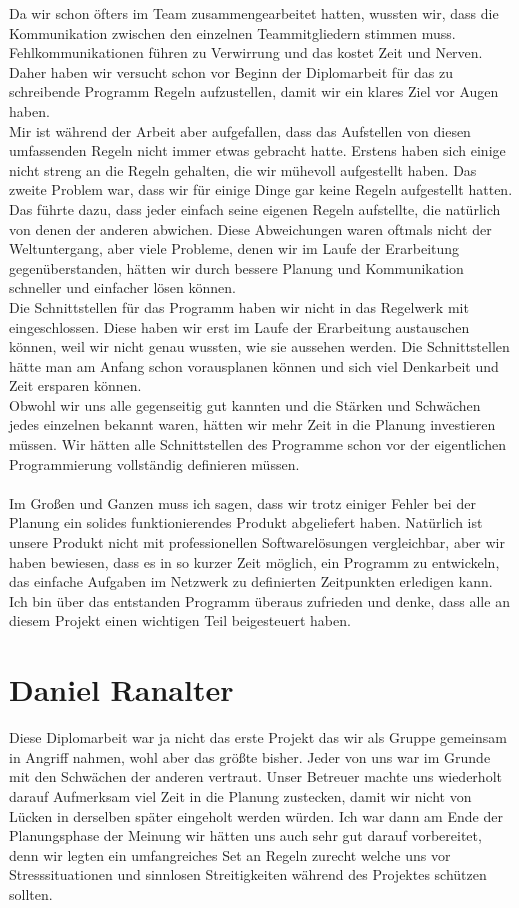 \documentclass[12pt,a4paper]{report}
\begin{document}
Da wir schon öfters im Team zusammengearbeitet hatten, wussten wir, dass die Kommunikation zwischen den einzelnen Teammitgliedern stimmen muss. Fehlkommunikationen führen zu Verwirrung und das kostet Zeit und Nerven. Daher haben wir versucht schon vor Beginn der Diplomarbeit für das zu schreibende Programm Regeln aufzustellen, damit wir ein klares Ziel vor Augen haben.\\ 
Mir ist während der Arbeit aber aufgefallen, dass das Aufstellen von diesen umfassenden Regeln nicht immer etwas gebracht hatte. Erstens haben sich einige nicht streng an die Regeln gehalten, die wir mühevoll aufgestellt haben. Das zweite Problem war, dass wir für einige Dinge gar keine Regeln aufgestellt hatten. Das führte dazu, dass jeder einfach seine eigenen Regeln aufstellte, die natürlich von denen der anderen abwichen. Diese Abweichungen waren oftmals nicht der Weltuntergang, aber viele Probleme, denen wir im Laufe der Erarbeitung gegenüberstanden, hätten wir durch bessere Planung und Kommunikation schneller und einfacher lösen können.\\
Die Schnittstellen für das Programm haben wir nicht in das Regelwerk mit eingeschlossen. Diese haben wir erst im Laufe der Erarbeitung austauschen können, weil wir nicht genau wussten, wie sie aussehen werden. Die Schnittstellen hätte man am Anfang schon vorausplanen können und sich viel Denkarbeit und Zeit ersparen können.\\
Obwohl wir uns alle gegenseitig gut kannten und die Stärken und Schwächen jedes einzelnen bekannt waren, hätten wir mehr Zeit in die Planung investieren müssen. Wir hätten alle Schnittstellen des Programme schon vor der eigentlichen Programmierung vollständig definieren müssen.\\\\
Im Großen und Ganzen muss ich sagen, dass wir trotz einiger Fehler bei der Planung ein solides funktionierendes Produkt abgeliefert haben. Natürlich ist unsere Produkt nicht mit professionellen Softwarelösungen vergleichbar, aber wir haben bewiesen, dass es in so kurzer Zeit möglich, ein Programm zu entwickeln, das einfache Aufgaben im Netzwerk zu definierten Zeitpunkten erledigen kann. Ich bin über das entstanden Programm überaus zufrieden und denke, dass alle an diesem Projekt einen wichtigen Teil beigesteuert haben.

\chapter{Daniel Ranalter}
Diese Diplomarbeit war ja nicht das erste Projekt das wir als Gruppe gemeinsam in Angriff nahmen, wohl aber das größte bisher. Jeder von uns war im Grunde mit den Schwächen der anderen vertraut. Unser Betreuer machte uns wiederholt darauf Aufmerksam viel Zeit in die Planung zustecken, damit wir nicht von Lücken in derselben später eingeholt werden würden. Ich war dann am Ende der Planungsphase der Meinung wir hätten uns auch sehr gut darauf vorbereitet, denn wir legten ein umfangreiches Set an Regeln zurecht welche uns vor Stresssituationen und sinnlosen Streitigkeiten während des Projektes schützen sollten.\\
\end{document}
